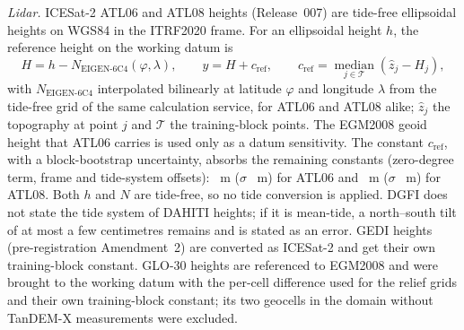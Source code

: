 \emph{Lidar.} ICESat-2 ATL06 and ATL08 heights (Release~007) are tide-free ellipsoidal heights on WGS84 in the ITRF2020 frame\citep{atl06_v7,atl08_v7,is2_compguide_r007}. For an ellipsoidal height $h$, the reference height on the working datum is
\begin{equation}
  H = h - N_{\mathrm{EIGEN\text{-}6C4}}(\varphi, \lambda) , \qquad y = H + c_{\mathrm{ref}} , \qquad
  c_{\mathrm{ref}} = \operatorname*{median}_{j \in \mathcal{T}} \left( \hat{z}_j - H_j \right) ,
  \label{eq:si_lidar_datum}
\end{equation}
with $N_{\mathrm{EIGEN\text{-}6C4}}$ interpolated bilinearly at latitude $\varphi$ and longitude $\lambda$ from the tide-free grid of the same calculation service, for ATL06 and ATL08 alike; $\hat{z}_j$ the topography at point $j$ and $\mathcal{T}$ the training-block points. The EGM2008 geoid height that ATL06 carries is used only as a datum sensitivity. The constant $c_{\mathrm{ref}}$, with a block-bootstrap uncertainty, absorbs the remaining constants (zero-degree term, frame and tide-system offsets): ~m ($\sigma$ ~m) for ATL06 and ~m ($\sigma$ ~m) for ATL08. Both $h$ and $N$ are tide-free, so no tide conversion is applied. DGFI does not state the tide system of DAHITI heights; if it is mean-tide, a north--south tilt of at most a few centimetres remains and is stated as an error. GEDI heights (pre-registration Amendment~2) are converted as ICESat-2 and get their own training-block constant. GLO-30 heights are referenced to EGM2008\citep{copdem_handbook_i5} and were brought to the working datum with the per-cell difference used for the relief grids and their own training-block constant; its two geocells in the domain without TanDEM-X measurements were excluded.

